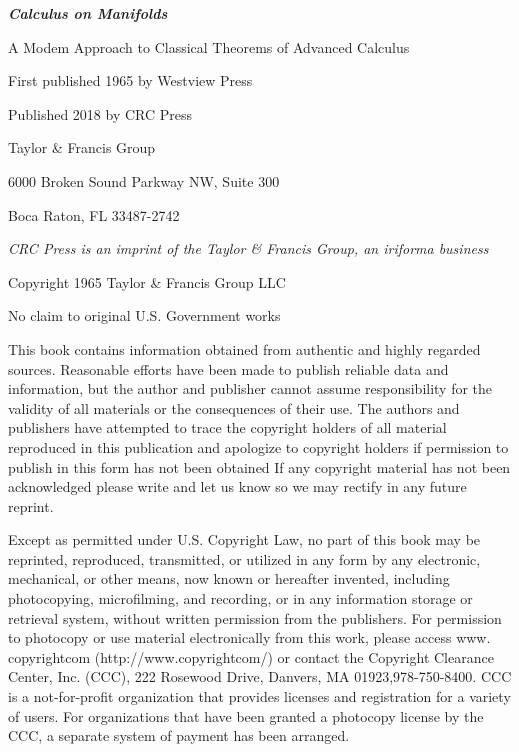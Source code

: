 \thispagestyle{empty}
\begin{center}
    \textbf{\itshape Calculus on Manifolds}

    A Modem Approach to Classical Theorems of Advanced Calculus

    \vspace*{1em}
    First published 1965 by Westview Press

    \vspace*{1em}
    Published 2018 by CRC Press

    Taylor \& Francis Group

    6000 Broken Sound Parkway NW, Suite 300

    Boca Raton, FL 33487-2742

    \vspace*{1em}
    \textit{CRC Press is an imprint of the Taylor \& Francis Group, an iriforma business}

    \vspace*{1em}
    Copyright \textcopyright{} 1965 Taylor \& Francis Group LLC

    \vspace*{1em}
    No claim to original U.S. Government works

    \vspace*{1em}
\end{center}

    This book contains information obtained from authentic and highly regarded
    sources. Reasonable efforts have been made to publish reliable data and
    information, but the author and publisher cannot assume responsibility for
    the validity of all materials or the consequences of their use. The authors and
    publishers have attempted to trace the copyright holders of all material
    reproduced in this publication and apologize to copyright holders if
    permission to publish in this form has not been obtained If any copyright
    material has not been acknowledged please write and let us know so we may
    rectify in any future reprint.

    Except as permitted under U.S. Copyright Law, no part of this book may be
    reprinted, reproduced, transmitted, or utilized in any form by any electronic,
    mechanical, or other means, now known or hereafter invented, including
    photocopying, microfilming, and recording, or in any information storage or
    retrieval system, without written permission from the publishers.
    For permission to photocopy or use material electronically from this work,
    please access www. copyrightcom (http://www.copyrightcom/) or contact
    the Copyright Clearance Center, Inc. (CCC), 222 Rosewood Drive, Danvers,
    MA 01923,978-750-8400. CCC is a not-for-profit organization that provides
    licenses and registration for a variety of users. For organizations that have
    been granted a photocopy license by the CCC, a separate system of payment
    has been arranged.

